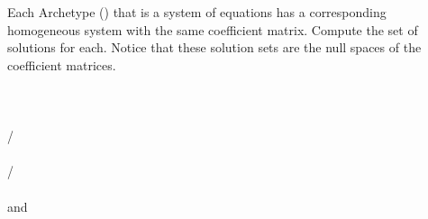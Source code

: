 Each Archetype () that is a system of equations has a corresponding homogeneous system with the same coefficient matrix.  Compute the set of solutions for each.  Notice that these solution sets are the null spaces of the coefficient matrices.\\
\\ 
\\ 
\\ 
/\\ 
\\ 
/ \\ 
\\ and

